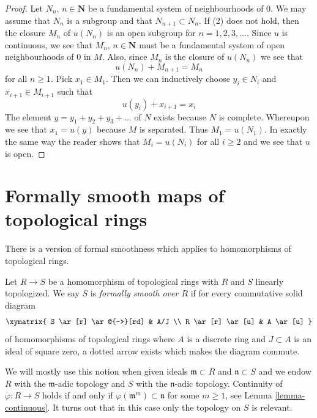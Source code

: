 \begin{proof}
Let $N_n$, $n \in \mathbf{N}$ be a fundamental system of neighbourhoods
of $0$. We may assume that $N_n$ is a subgroup and that
$N_{n + 1} \subset N_n$. If (2) does not hold, then
the closure $M_n$ of $u(N_n)$ is an open subgroup for $n = 1, 2, 3, \ldots$.
Since $u$ is continuous, we see that $M_n$, $n \in \mathbf{N}$
must be a fundamental system of open neighbourhoods of $0$ in $M$.
Also, since $M_n$ is the closure of $u(N_n)$ we see that
$$
u(N_n) + M_{n + 1} = M_n
$$
for all $n \geq 1$. Pick $x_1 \in M_1$. Then we can inductively choose
$y_i \in N_i$ and $x_{i + 1} \in M_{i + 1}$ such that
$$
u(y_i) + x_{i + 1} = x_i
$$
The element $y = y_1 + y_2 + y_3 + \ldots$ of $N$ exists because
$N$ is complete. Whereupon we see that $x_1 = u(y)$ because $M$ is separated.
Thus $M_1 = u(N_1)$. In exactly the same way the reader shows that
$M_i = u(N_i)$ for all $i \geq 2$ and we see that $u$ is open.
\end{proof}









\section{Formally smooth maps of topological rings}
\label{section-formally-smooth}

\noindent
There is a version of formal smoothness which applies to
homomorphisms of topological rings.

\begin{definition}
\label{definition-formally-smooth}
Let $R \to S$ be a homomorphism of topological rings with $R$ and $S$
linearly topologized. We say $S$ is {\it formally smooth over $R$} if
for every commutative solid diagram
$$
\xymatrix{
S \ar[r] \ar@{-->}[rd] & A/J \\
R \ar[r] \ar[u] & A \ar[u]
}
$$
of homomorphisms of topological rings where $A$ is a discrete ring and
$J \subset A$ is an ideal of square zero, a dotted arrow exists which
makes the diagram commute.
\end{definition}

\noindent
We will mostly use this notion when given ideals $\mathfrak m \subset R$
and $\mathfrak n \subset S$ and we endow $R$ with the $\mathfrak m$-adic
topology and $S$ with the $\mathfrak n$-adic topology. Continuity of
$\varphi : R \to S$ holds if and only if
$\varphi(\mathfrak m^m) \subset  \mathfrak n$ for some $m \geq 1$, see
Lemma \ref{lemma-continuous}. It turns out that
in this case only the topology on $S$ is relevant.

